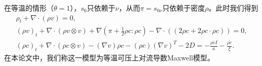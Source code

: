 	在等温的情形（$\theta=1$），$s_0$只依赖于$\nu$，从而$\pi = s_{0\nu}$只依赖于密度$\rho$。此时我们得到
	\begin{subequations} \label{eq:ECDFsecondisothermal}
		\begin{align}
			\rho_t + \nabla \cdot (\rho v) = 0 ,\\
			(\rho v)_t + \nabla \cdot (\rho v \otimes v) + \nabla (\pi + \frac{1}{2} \rho c: \rho c)  - \nabla \cdot ( (2 \rho c + 2 \rho c \cdot \rho c)) =0 ,\\
			(\rho c)_t +  \nabla \cdot (\rho c \otimes v) - (\nabla v) \rho c - (\rho c) (\nabla v)^T - 2 D = - \frac{\rho \dot{c}I}{\kappa} -  \frac{\rho \mathring{c}}{\xi}  .
		\end{align}
	\end{subequations}
	在本论文中，我们称这一模型为等温可压上对流导数Maxwell模型。

